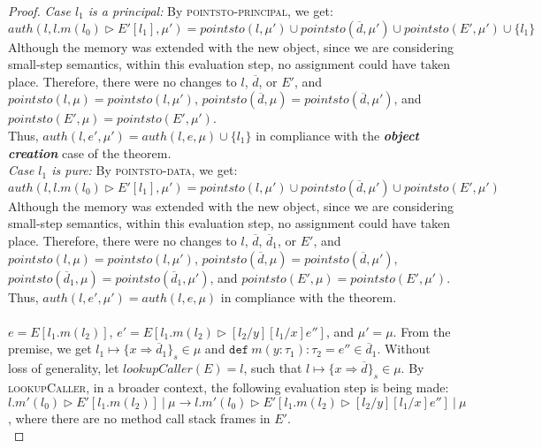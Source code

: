 \documentclass{llncs}
\newcommand{\keywadj}[1]{\mathtt{#1}}
\newcommand{\keyw}[1]{\keywadj{#1}~}
\begin{document}
\begin{proof}
\noindent\textit{Case $l_1$ is a principal:} By \textsc{pointsto-principal}, we get:
\[
auth(l, l.m(l_0) \rhd E'[l_1], \mu') = pointsto(l, \mu') \cup pointsto(\overline{d}, \mu') \cup pointsto(E', \mu') \cup \{ l_1 \}
\]
Although the memory was extended with the new object, since we are considering small-step semantics, within this evaluation step, no assignment could have taken place. Therefore, there were no changes to $l$, $\overline{d}$, or $E'$, and $pointsto(l, \mu) = pointsto(l, \mu')$, $pointsto(\overline{d}, \mu) = pointsto(\overline{d}, \mu')$, and $pointsto(E', \mu) = pointsto(E', \mu')$.\\

\noindent Thus, $auth(l, e', \mu') = auth(l, e, \mu) \cup \{ l_1 \}$ in compliance with the \textbf{\textit{object creation}} case of the theorem.\\

\noindent\textit{Case $l_1$ is pure:} By \textsc{pointsto-data}, we get:
\[
auth(l, l.m(l_0) \rhd E'[l_1], \mu') = pointsto(l, \mu') \cup pointsto(\overline{d}, \mu') \cup pointsto(E', \mu')
\]
Although the memory was extended with the new object, since we are considering small-step semantics, within this evaluation step, no assignment could have taken place. Therefore, there were no changes to $l$, $\overline{d}$, $\overline{d}_1$, or $E'$, and $pointsto(l, \mu) = pointsto(l, \mu')$, $pointsto(\overline{d}, \mu) = pointsto(\overline{d}, \mu')$, $pointsto(\overline{d}_1, \mu) = pointsto(\overline{d}_1, \mu')$, and $pointsto(E', \mu) = pointsto(E', \mu')$.\\

\noindent Thus, $auth(l, e', \mu') = auth(l, e, \mu)$ in compliance with the theorem.\\\\


\noindent{}
$e = E[l_1.m(l_2)]$, $e' = E[l_1.m(l_2) \rhd [l_2/y] [l_1/x] e'']$, and $\mu' = \mu$. From the premise, we get $l_1 \mapsto \{ x \Rightarrow \overline{d}_1 \}_{s} \in \mu$ and $\keyw{def} m(y : \tau_1) : \tau_2 = e'' \in \overline{d}_1$. Without loss of generality, let $lookupCaller(E) = l$, such that $l \mapsto \{ x \Rightarrow \overline{d} \}_{s} \in \mu$. By \textsc{lookupCaller}, in a broader context, the following evaluation step is being made: \mbox{$l.m'(l_0) \rhd E'[l_1.m(l_2)]~|~\mu \longrightarrow l.m'(l_0) \rhd E'[l_1.m(l_2) \rhd [l_2/y] [l_1/x] e'']~|~\mu$}, where there are no method call stack frames in $E'$.\\


\end{proof}
\end{document}
